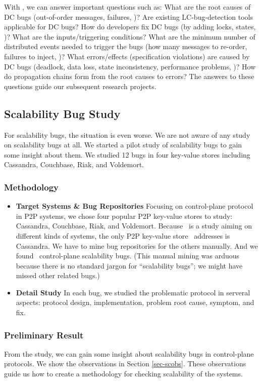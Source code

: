 With \taxdc, we can answer important questions such as: What are the root causes
of DC bugs (out-of-order messages, failures, \etc)?  Are existing
LC-bug-detection tools applicable for DC bugs? How do developers fix DC bugs (by
adding locks, states, \etc)? What are the inputs/triggering conditions?  What
are the minimum number of distributed events needed to trigger the bugs (how
many messages to re-order, failures to inject, \etc)?  What errors/effects
(specification violations) are caused by DC bugs (deadlock, data loss, state
inconsistency, performance problems, \etc)? How do propagation chains form from
the root causes to errors? The answers to these questions guide our subsequent
research projects.

\subsection{Scalability Bug Study}

For scalability bugs, the situation is even worse. We are not aware of any study
on scalability bugs at all. We started a pilot study of scalability bugs to gain
some insight about them. We studied 12 bugs in four key-value stores including
Cassandra, Couchbase, Riak, and Voldemort.

\subsubsection{Methodology}

\begin{itemize}

\item {\bf Target Systems \& Bug Repositories} Focusing on control-plane
protocol in P2P systems, we chose four popular P2P key-value stores to study:
Cassandra, Couchbase, Riak, and Voldemort. Because \cbs\ is a study aiming on
different kinds of systems, the only P2P key-value store \cbs\ addresses is
Cassandra. We have to mine bug repositories for the others manually.  And we
found \numStudy\ control-plane scalability bugs.  (This manual mining was arduous
because there is no standard jargon for ``scalability bugs''; we might have
missed other related bugs.)

\item {\bf Detail Study} In each bug, we studied the problematic protocol in
serveral aspects: protocol design, implementation, problem root cause, symptom,
and fix.

\end{itemize}

\subsubsection{Preliminary Result}

From the study, we can gain some insight about scalability bugs in control-plane
protocols. We show the observations in Section \ref{sec-scobs}. These
observations guide us how to create a methodology for checking scalability of
the systems.


